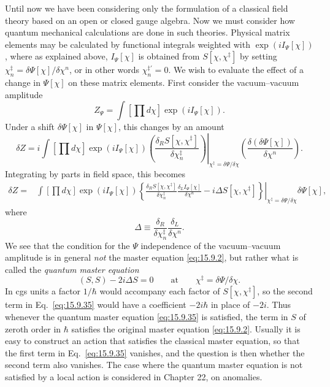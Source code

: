 Until now we have been considering only the formulation of a classical field
theory based on an open or closed gauge algebra. Now we must consider how
quantum mechanical calculations are done in such theories. Physical matrix
elements may be calculated by functional integrals weighted with
$\exp(iI_\Psi[\chi])$, where as explained above, $I_\Psi[\chi]$ is obtained
from $S[\chi,\chi^{\ddagger}]$ by setting
$\chi_n^{\ddagger}=\delta\Psi[\chi]/\delta\chi^n$, or in other words
$\chi_n^{\ddagger\prime}=0$. We wish to evaluate the effect of a change in
$\Psi[\chi]$ on these matrix elements. First consider the vacuum--vacuum
amplitude
\begin{equation}
Z_\Psi=\int\left[\prod d\chi\right]\exp(iI_\Psi[\chi]).
\tag{15.9.31}\label{eq:15.9.31}
\end{equation}
Under a shift $\delta\Psi[\chi]$ in $\Psi[\chi]$, this changes by an amount
\begin{equation}
\delta Z=i\int\left[\prod d\chi\right]\exp(iI_\Psi[\chi])
\left.
\left(\frac{\delta_R S[\chi,\chi^{\ddagger}]}
{\delta\chi_n^{\ddagger}}\right)
\right|_{\chi^{\ddagger}=\delta\Psi/\delta\chi}
\left(\frac{\delta(\delta\Psi[\chi])}{\delta\chi^n}\right).
\tag{15.9.32}\label{eq:15.9.32}
\end{equation}
Integrating by parts in field space, this becomes
\begin{align}
\delta Z={}&\int\left[\prod d\chi\right]\exp(iI_\Psi[\chi])
\left.
\left\{
\frac{\delta_R S[\chi,\chi^{\ddagger}]}
{\delta\chi_n^{\ddagger}}
\frac{\delta_L I_\Psi[\chi]}{\delta\chi^n}
-i\Delta S[\chi,\chi^{\ddagger}]
\right\}\right|_{\chi^{\ddagger}=\delta\Psi/\delta\chi}
\delta\Psi[\chi],
\tag{15.9.33}\label{eq:15.9.33}
\end{align}
where
\begin{equation}
\Delta\equiv
\frac{\delta_R}{\delta\chi_n^{\ddagger}}
\frac{\delta_L}{\delta\chi^n}.
\tag{15.9.34}\label{eq:15.9.34}
\end{equation}
We see that the condition for the $\Psi$ independence of the vacuum--vacuum
amplitude is in general \emph{not} the master equation \eqref{eq:15.9.2}, but
rather what is called the \emph{quantum master equation}
\begin{equation}
(S,S)-2i\Delta S=0
\qquad\text{at}\qquad
\chi^{\ddagger}=\delta\Psi/\delta\chi.
\tag{15.9.35}\label{eq:15.9.35}
\end{equation}
In cgs units a factor $1/\hbar$ would accompany each factor of
$S[\chi,\chi^{\ddagger}]$, so the second term in Eq.~\eqref{eq:15.9.35} would
have a coefficient $-2i\hbar$ in place of $-2i$. Thus whenever the quantum
master equation \eqref{eq:15.9.35} is satisfied, the term in $S$ of zeroth
order in $\hbar$ satisfies the original master equation \eqref{eq:15.9.2}.
Usually it is easy to construct an action that satisfies the classical master
equation, so that the first term in Eq.~\eqref{eq:15.9.35} vanishes, and the
question is then whether the second term also vanishes. The case where the
quantum master equation is not satisfied by a local action is considered in
Chapter 22, on anomalies.

